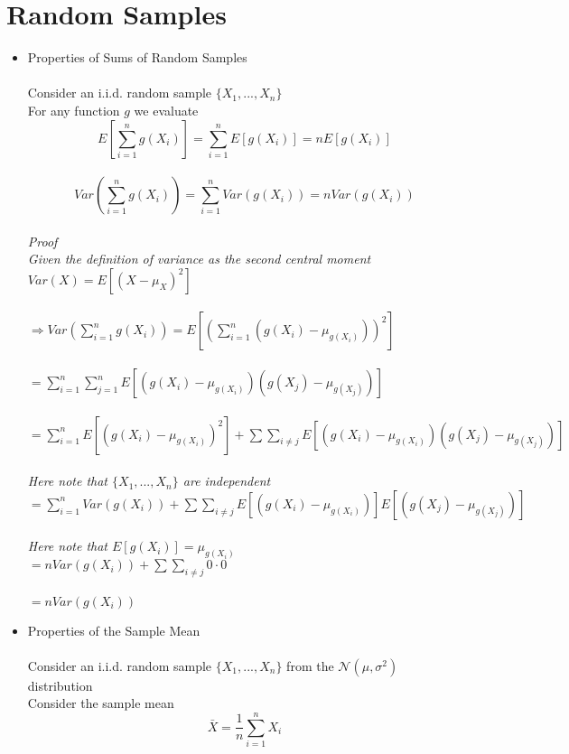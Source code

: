 \documentclass{article}
\begin{document}
\section{Random Samples}
\begin{itemize}
    \item Properties of Sums of Random Samples\\\\
    Consider an i.i.d. random sample $\{X_1,...,X_n\}$\\
    For any function $g$ we evaluate\\
    $$E[\sum_{i=1}^ng(X_i)]=\sum_{i=1}^nE[g(X_i)]=nE[g(X_i)]$$\\
    $$Var(\sum_{i=1}^ng(X_i))=\sum_{i=1}^nVar(g(X_i))=nVar(g(X_i))$$\\
    \emph{Proof}\\
    \emph{Given the definition of variance as the second central moment}\\
    $Var(X)=E[(X-\mu_X)^2]$\\\\
    $\Rightarrow Var(\sum_{i=1}^ng(X_i))=E[(\sum_{i=1}^n(g(X_i)-\mu_{g(X_i)}))^2]$\\\\
    $=\sum_{i=1}^n\sum_{j=1}^nE[(g(X_i)-\mu_{g(X_i)})(g(X_j)-\mu_{g(X_j)})]$\\\\
    $=\sum_{i=1}^nE[(g(X_i)-\mu_{g(X_i)})^2]+\sum\sum_{i\neq j}E[(g(X_i)-\mu_{g(X_i)})(g(X_j)-\mu_{g(X_j)})]$\\\\
    \emph{Here note that $\{X_1,...,X_n\}$ are independent}\\
    $=\sum_{i=1}^nVar(g(X_i))+\sum\sum_{i\neq j}E[(g(X_i)-\mu_{g(X_i)})]E[(g(X_j)-\mu_{g(X_j)})]$\\\\
    \emph{Here note that $E[g(X_i)]=\mu_{g(X_i)}$}\\
    $=nVar(g(X_i))+\sum\sum_{i\neq j}0\cdot0$\\\\
    $=nVar(g(X_i))$
    \item Properties of the Sample Mean\\\\
    Consider an i.i.d. random sample $\{X_1,...,X_n\}$ from the $\mathcal{N}(\mu,\sigma^2)$ distribution\\
    Consider the sample mean\\
    $$\bar{X}=\dfrac{1}{n}\sum_{i=1}^nX_i$$\\

\end{itemize}
\end{document}
